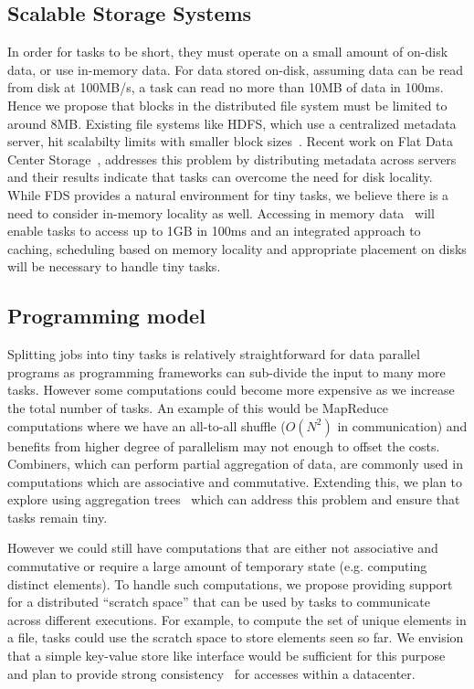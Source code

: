 \subsection{Scalable Storage Systems}
In order for tasks to be short, they must operate on a small amount of on-disk
data, or use in-memory data.  For data stored on-disk, assuming data can be read
from disk at 100MB/s, a task can read no more than 10MB of data in 100ms.  Hence
we propose that blocks in the distributed file system must be limited to around
8MB. Existing file systems like HDFS, which use a centralized metadata server,
hit scalabilty limits with smaller block sizes~\cite{facebook-berkeley-talk}.
Recent work on Flat Data Center Storage~\cite{fds}, addresses this problem by
distributing metadata across servers and their results indicate that tasks can
overcome the need for disk locality. While FDS provides a natural environment
for tiny tasks, we believe there is a need to consider in-memory locality as
well. Accessing in memory data~\cite{pacman, spark} will enable tasks to access 
up to 1GB in 100ms and an integrated approach to caching, scheduling based on
memory locality and appropriate placement on disks will be necessary to handle
tiny tasks.

\subsection{Programming model}
\label{sec:prog}
Splitting jobs into tiny tasks is relatively straightforward for data parallel
programs as programming frameworks can sub-divide the input to many more tasks.
However some computations could become more expensive as we increase the total
number of tasks. An example of this would be MapReduce computations where we
have an all-to-all shuffle ($O(N^2)$ in communication) and benefits from higher
degree of parallelism may not enough to offset the costs. Combiners, which can
perform partial aggregation of data, are commonly used in computations which are
associative and commutative. Extending this, we plan to explore using
aggregation trees~\cite{something} which can address this problem and ensure
that tasks remain tiny.

However we could still have computations that are either not associative and
commutative or require a large amount of temporary state (e.g. computing
distinct elements). To handle such computations, we propose providing 
support for a distributed ``scratch space'' that can be used by tasks to 
communicate across different executions. For example, to compute the set of
unique elements in a file, tasks could use the scratch space to store elements
seen so far. We envision that a simple key-value store like interface would
be sufficient for this purpose and plan to provide strong 
consistency~\cite{something} for accesses within a datacenter. 

